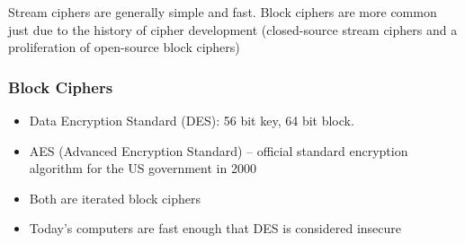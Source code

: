 \documentclass[../notes.tex]{subfiles}
\begin{document}
Stream ciphers are generally simple and fast. Block ciphers are more common just due to the history of cipher development (closed-source stream ciphers and a proliferation of open-source block ciphers)


\subsubsection{Block Ciphers}

\begin{itemize}
    \item Data Encryption Standard (DES): 56 bit key, 64 bit block.
    \item AES (Advanced Encryption Standard) -- official standard encryption algorithm for the US government in 2000
    \item Both are iterated block ciphers
    \item Today's computers are fast enough that DES is considered insecure
\end{itemize}
\end{document}
